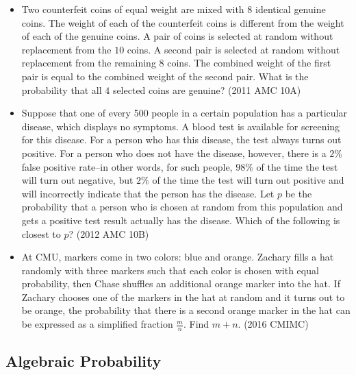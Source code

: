 \documentclass{article}
\begin{document}
\begin{itemize}

\item Two counterfeit coins of equal weight are mixed with $8$ identical genuine coins. The weight of each of the counterfeit coins is different from the weight of each of the genuine coins. A pair of coins is selected at random without replacement from the $10$ coins. A second pair is selected at random without replacement from the remaining $8$ coins. The combined weight of the first pair is equal to the combined weight of the second pair. What is the probability that all $4$ selected coins are genuine? (2011 AMC 10A)

\item Suppose that one of every 500 people in a certain population has a particular disease, which displays no symptoms. A blood test is available for screening for this disease. For a person who has this disease, the test always turns out positive. For a person who does not have the disease, however, there is a $2\%$ false positive rate--in other words, for such people, $98\%$ of the time the test will turn out negative, but $2\%$ of the time the test will turn out positive and will incorrectly indicate that the person has the disease. Let $p$ be the probability that a person who is chosen at random from this population and gets a positive test result actually has the disease. Which of the following is closest to $p$? (2012 AMC 10B)

\item At CMU, markers come in two colors: blue and orange. Zachary fills a hat randomly with three markers such that each color is chosen with equal probability, then Chase shuffles an additional orange marker into the hat. If Zachary chooses one of the markers in the hat at random and it turns out to be orange, the probability that there is a second orange marker in the hat can be expressed as a simplified fraction $\frac{m}{n}$. Find $m+n$. (2016 CMIMC)

\end{itemize}


\subsection{Algebraic Probability}
\end{document}
